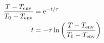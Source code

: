 \setcounter{equation}{1}
\begin{align}
    \frac{T - T_{\mathrm{env}}}{T_0 - T_{\mathrm{env}}}
        &= \mathrm{e}^{-t/\tau} \notag \\
    t &= -\tau \ln \left(
        \frac{T - T_{\mathrm{env}}}{T_0 - T_{\mathrm{env}}} \right)
\end{align}
